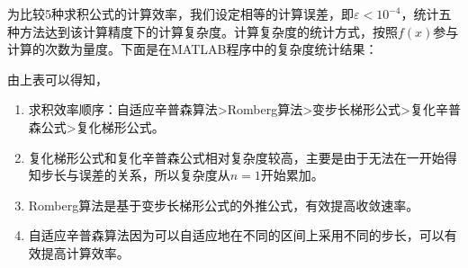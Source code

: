 为比较5种求积公式的计算效率，我们设定相等的计算误差，即$\varepsilon < 10^{-4}$，统计五种方法达到该计算精度下的计算复杂度。计算复杂度的统计方式，按照$f(x)$参与计算的次数为量度。下面是在MATLAB程序中的复杂度统计结果：
\begin{table}[!hpt]
    \caption{5种求积公式计算复杂度统计表}
    \label{tab:Complexity}
    \centering
\end{table}

由上表可以得知，
\begin{enumerate}
    \item 求积效率顺序：自适应辛普森算法>Romberg算法>变步长梯形公式>复化辛普森公式>复化梯形公式。
    \item 复化梯形公式和复化辛普森公式相对复杂度较高，主要是由于无法在一开始得知步长与误差的关系，所以复杂度从$n=1$开始累加。
    \item Romberg算法是基于变步长梯形公式的外推公式，有效提高收敛速率。
    \item 自适应辛普森算法因为可以自适应地在不同的区间上采用不同的步长，可以有效提高计算效率。
\end{enumerate}


